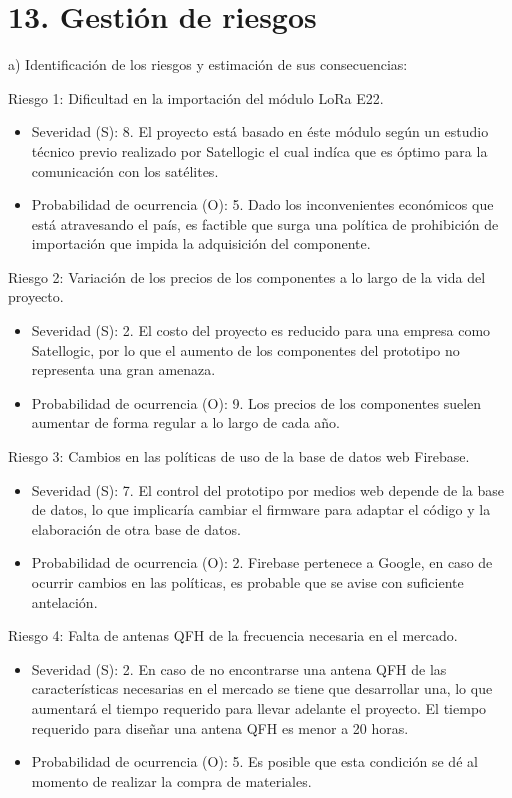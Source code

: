 \documentclass[
11pt, %
codirector, %
]{charter}
\begin{document}
\section{13. Gestión de riesgos}
\label{sec:riesgos}

a) Identificación de los riesgos y estimación de sus consecuencias:

Riesgo 1: Dificultad en la importación del módulo LoRa E22.
\begin{itemize}
	\item Severidad (S): 8. El proyecto está basado en éste módulo según un estudio técnico previo realizado por Satellogic el cual indíca que es óptimo para la comunicación con los satélites.
	\item Probabilidad de ocurrencia (O): 5. Dado los inconvenientes económicos que está atravesando el país, es factible que surga una política de prohibición de importación que impida la adquisición del componente.
\end{itemize} 

Riesgo 2: Variación de los precios de los componentes a lo largo de la vida del proyecto.
\begin{itemize}
	\item Severidad (S): 2. El costo del proyecto es reducido para una empresa como Satellogic, por lo que el aumento de los componentes del prototipo no representa una gran amenaza.
	\item Probabilidad de ocurrencia (O): 9. Los precios de los componentes suelen aumentar de forma regular a lo largo de cada año.
\end{itemize}

Riesgo 3: Cambios en las políticas de uso de la base de datos web Firebase.
\begin{itemize}
	\item Severidad (S): 7. El control del prototipo por medios web depende de la base de datos, lo que implicaría cambiar el firmware para adaptar el código y la elaboración de otra base de datos.
	\item Probabilidad de ocurrencia (O): 2. Firebase pertenece a Google, en caso de ocurrir cambios en las políticas, es probable que se avise con suficiente antelación.
\end{itemize}

Riesgo 4: Falta de antenas QFH de la frecuencia necesaria en el mercado.
\begin{itemize}
	\item Severidad (S): 2. En caso de no encontrarse una antena QFH de las características necesarias en el mercado se tiene que desarrollar una, lo que aumentará el tiempo requerido para llevar adelante el proyecto. El tiempo requerido para diseñar una antena QFH es menor a 20 horas.
	\item Probabilidad de ocurrencia (O): 5. Es posible que esta condición se dé al momento de realizar la compra de materiales.
\end{itemize} 
\end{document}
